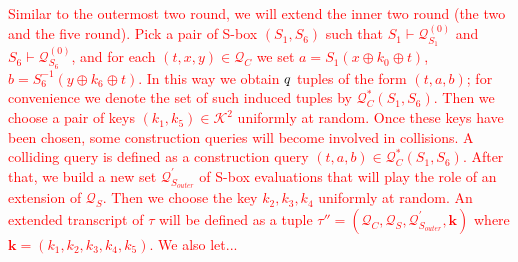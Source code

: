 \textcolor{red}{Similar to the outermost two round, we will extend the inner two round (the two and the five round).  Pick a pair of S-box $(S_1, S_6)$ such that $S_{1} \vdash \mathcal{Q}_{S_{1}}^{(0)}$ and $S_{6} \vdash \mathcal{Q}_{S_{6}}^{(0)}$, and for each $ (t, x, y) \in \mathcal{Q}_{C}$ we set $a=S_{1}\left(x \oplus k_{0} \oplus t\right)$, $b=S_{6}^{-1}\left(y \oplus k_{6} \oplus t\right)$. In this way we obtain $\mathnormal{q}$ tuples of the form $(t, a, b)$; for convenience we denote the set of such induced tuples by $\mathcal{Q}_{C}^{*}\left(S_{1}, S_{6}\right)$. Then we choose a pair of keys $\left(k_{1}, k_{5}\right) \in \mathcal{K}^{2}$ uniformly at random. Once these keys have been chosen, some construction queries will become involved in collisions. A colliding query is defined as a construction query $(t, a, b) \in \mathcal{Q}_{C}^{*}\left(S_{1}, S_{6}\right)$. After that, we build a new set $\mathcal{Q}_{S_{outer}}^{\prime}$ of S-box evaluations that will play the role of an extension of $\mathcal{Q}_{S}$. Then we choose the key $k_2, k_3, k_4$ uniformly at random. An extended transcript of $\tau$ will be defined as a tuple $\tau''=\left(\mathcal{Q}_{C}, \mathcal{Q}_{S}, \mathcal{Q}_{S_{outer}}^{\prime}, \mathbf{k}\right)$ where $\mathbf{k}=\left(k_{1}, k_{2},k_{3},k_{4}, k_{5}\right)$. We also let...}

%
%
%

